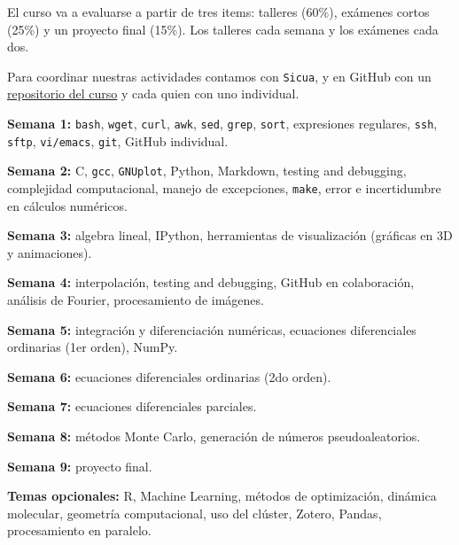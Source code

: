 \documentclass[letterpaper,10pt,onecolumn]{article}
\begin{document}
\vspace{0.3cm}
\noindent El curso va a evaluarse a partir de tres items: talleres (60\%), exámenes cortos (25\%) y un proyecto final (15\%). Los talleres cada semana y los exámenes cada dos.

\noindent Para coordinar nuestras actividades contamos con \verb+Sicua+, y en GitHub con un \href{https://github.com/ComputoCienciasUniandes/MetodosComputacionales}{repositorio del curso} y cada quien con uno individual.

\vspace{0.5cm}

\noindent\textbf{Semana 1:} \verb+bash+, \verb+wget+, \verb+curl+, \verb+awk+, \verb+sed+, \verb+grep+, \verb+sort+, expresiones regulares, \verb+ssh+, \verb+sftp+, \verb+vi/emacs+, \verb+git+, GitHub individual.

\noindent\textbf{Semana 2:} C, \verb+gcc+, \verb+GNUplot+, Python, Markdown, testing and debugging, complejidad computacional, manejo de excepciones, \verb+make+, error e incertidumbre en cálculos numéricos.

\noindent\textbf{Semana 3:} algebra lineal, IPython, herramientas de visualización (gráficas en 3D y animaciones).

\noindent\textbf{Semana 4:} interpolación, testing and debugging, GitHub en colaboración, análisis de Fourier, procesamiento de imágenes.

\noindent\textbf{Semana 5:} integración y diferenciación numéricas, ecuaciones diferenciales ordinarias (1er orden), NumPy.

\noindent\textbf{Semana 6:} ecuaciones diferenciales ordinarias (2do orden).

\noindent\textbf{Semana 7:} ecuaciones diferenciales parciales.

\noindent\textbf{Semana 8:} métodos Monte Carlo, generación de números pseudoaleatorios.

\noindent\textbf{Semana 9:} proyecto final.

\vspace{0.1cm}
\noindent\textbf{Temas opcionales:} R, Machine Learning, métodos de optimización, dinámica molecular, geometría computacional, uso del clúster, Zotero, Pandas, procesamiento en paralelo.
\end{document}
